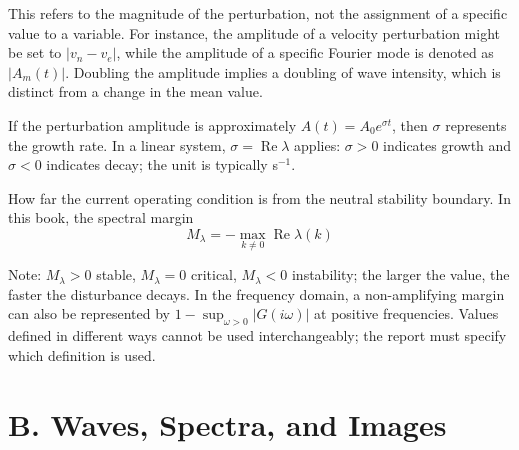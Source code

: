 \documentclass[11pt,a4paper,openany]{book}
\numberwithin{equation}{chapter}
\numberwithin{figure}{chapter}
\numberwithin{table}{chapter}
\begin{document}
\begin{description}[style=unboxed,leftmargin=0pt,labelindent=0pt,labelsep=0.5em,itemsep=0.65em,font=\normalfont\bfseries\color{navy}]
\item[Amplitude]


This refers to the magnitude of the perturbation, not the assignment of a specific value to a variable. For instance, the amplitude of a velocity perturbation might be set to $|v_n-v_e|$, while the amplitude of a specific Fourier mode is denoted as $|A_m(t)|$. Doubling the amplitude implies a doubling of wave intensity, which is distinct from a change in the mean value.



\item[Growth/decay rate]


If the perturbation amplitude is approximately $A(t)=A_0e^{\sigma t}$, then $\sigma$ represents the growth rate. In a linear system, $\sigma=\operatorname{Re}\lambda$ applies: $\sigma>0$ indicates growth and $\sigma<0$ indicates decay; the unit is typically s$^{-1}$.



\newpage
\item[Stability margin]


How far the current operating condition is from the neutral stability boundary. In this book, the spectral margin
\[
M_\lambda=-\max_{k\ne0}\operatorname{Re}\lambda(k)
\]





Note: $M_\lambda>0$ stable, $M_\lambda=0$ critical, $M_\lambda<0$ instability; the larger the value, the faster the disturbance decays. In the frequency domain, a non-amplifying margin can also be represented by $1-\sup_{\omega>0}|G(i\omega)|$ at positive frequencies. Values defined in different ways cannot be used interchangeably; the report must specify which definition is used.







\end{description}

\section*{B. Waves, Spectra, and Images}
\end{document}
